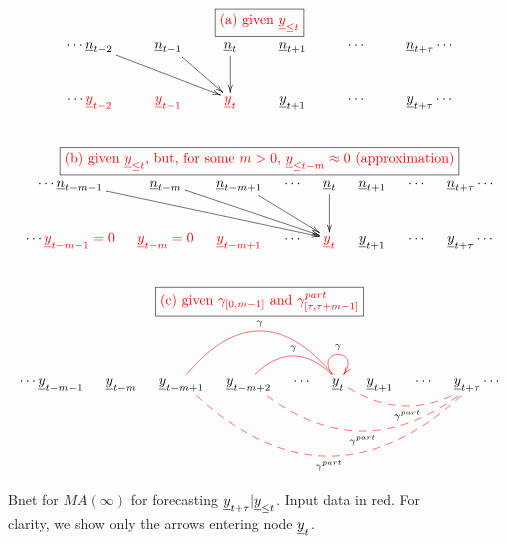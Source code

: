 \newcommand{\yLt}[0]
{given $\rvy_{\leq t}$}


\newcommand{\ynAPPROX}[0]
{given $\rvy_{\leq t}$, but,
 for some $m>0$,
$\rvy_{\leq t-m}\approx 0$ (approximation)}

\newcommand{\gammaEXACT}[0]
{given $\gamma_{[0,m-1]}$
and $\gamma^{part}_{[\tau,\tau+ m-1]}$}


\begin{figure}[h!]
$$
\begin{array}{c}
\fbox{\text{\color{red}(a) \yLt}}
\\
\xymatrix{
\cdots
\rvn_{t-2}\ar[drr]
&\rvn_{t-1}\ar[dr]
&\rvn_t\ar[d]
&\rvn_{t+1}
&\cdots
&\rvn_{t+\tau}
\cdots
\\
\cdots
{\color{red}\rvy_{t-2}}
&{\color{red}\rvy_{t-1}}
&{\color{red}\rvy_t}
&\rvy_{t+1}
&\cdots
&\rvy_{t+\tau}
\cdots
}
\\
\\
\\
\fbox{\text{\color{red}(b) \ynAPPROX}}
\\
\xymatrix@C=10px{
\cdots
\rvn_{t-m-1}\ar[drrrr]
&\rvn_{t-m}\ar[drrr]
&\rvn_{t-m+1}\ar[drr]
&\cdots
&\rvn_{t}\ar[d]
&\rvn_{t+1}
&\cdots
&\rvn_{t+\tau}
\cdots
\\
\cdots
{\color{red}\rvy_{t-m-1}=0}
&{\color{red}\rvy_{t-m}=0}
&{\color{red}\rvy_{t-m+1}}
&\cdots
&{\color{red}\rvy_{t}}
&\rvy_{t+1}
&\cdots
&\rvy_{t+\tau}
\cdots
}
\\
\\
\\
\fbox{\color{red}(c) \gammaEXACT}
\\
\xymatrix@C=10px{
\cdots
\rvy_{t-m-1}
&\rvy_{t-m}
&\rvy_{t-m+1}
&\rvy_{t-m+2}
&\cdots
&\rvy_{t}\ar@[red]@/_3pc/@{-}[lll]_\gamma
\ar@[red]@/_1.5pc/@{-}[ll]_\gamma
\ar@[red]@(ul,ur)[]^\gamma
&\rvy_{t+1}
&\cdots
&\rvy_{t+\tau}
\ar@[red]@/^1.5pc/@{--}[lll]^{\gamma^{part}}
\ar@[red]@/^3pc/@{--}[lllll]^{\gamma^{part}}
\ar@[red]@/^4.5pc/@{--}[llllll]^{\gamma^{part}}
\cdots
}
\end{array}
$$
\caption{Bnet for
$MA(\infty)$
for forecasting
${\underline{y}}_{t+\tau}|{\underline{y}}_{\leq t}$.
Input data in red.
For clarity, we show
 only the arrows entering
node ${\underline{y}}_t$.}
\label{fig-forecasting-cases}
\end{figure}

